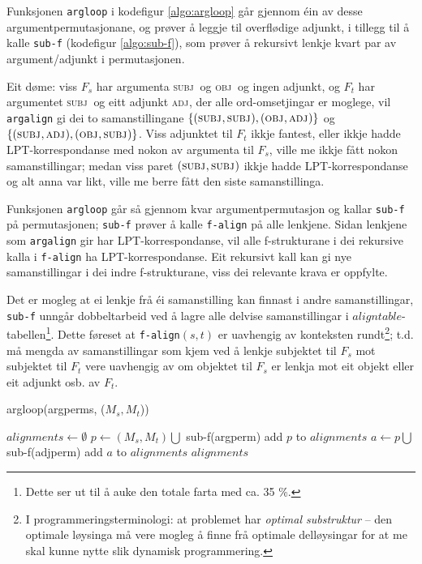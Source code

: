 \documentclass[12pt,a4paper,oneside,draft]{report}
\newcommand{\F}[2]{\textsc{#1}\ensuremath{_{#2}}}
\newcommand{\OBJ}{\F{obj}{}}
\newcommand{\OBJs}{\F{obj~}{}}
\newcommand{\ADJ}{\F{adj}{}}
\newcommand{\SUBJ}{\F{subj}{}}
\newcommand{\SUBJs}{\F{subj~}{}}
\begin{document}
 Funksjonen \texttt{argloop} i kodefigur \ref{algo:argloop} går gjennom éin
 av desse argumentpermutasjonane, og prøver å leggje til overflødige
 adjunkt, i tillegg til å kalle \texttt{sub-f} (kodefigur \ref{algo:sub-f}),
 som prøver å rekursivt lenkje kvart par av argument/adjunkt i
 permutasjonen.

 Eit døme: viss $F_s$ har argumenta \SUBJs og \OBJs og ingen adjunkt,
 og $F_t$ har argumentet \SUBJs og eitt adjunkt \ADJ, der alle
 ord-omsetjingar er moglege, vil \texttt{argalign} gi dei to samanstillingane
 $\{(\SUBJ,\SUBJ), (\OBJ,\ADJ)\}$ og $\{(\SUBJ,\ADJ),
 (\OBJ,\SUBJ)\}$. Viss adjunktet til $F_t$ ikkje fantest, eller ikkje
 hadde LPT\hyp{}korrespondanse med nokon av argumenta til $F_s$, ville me
 ikkje fått nokon samanstillingar; medan viss paret $(\SUBJ,\SUBJ)$
 ikkje hadde LPT\hyp{}korrespondanse og alt anna var likt, ville me berre
 fått den siste samanstillinga.

 Funksjonen \texttt{argloop} går så gjennom kvar argumentpermutasjon og
 kallar \texttt{sub-f} på permutasjonen; \texttt{sub-f} prøver å kalle \texttt{f-align} på
 alle lenkjene. Sidan lenkjene som \texttt{argalign} gir har
 LPT\hyp{}korrespondanse, vil alle f\hyp{}strukturane i dei rekursive kalla i
 \texttt{f-align} ha LPT\hyp{}korrespondanse. Eit rekursivt kall kan gi nye
 samanstillingar i dei indre f\hyp{}strukturane, viss dei relevante krava
 er oppfylte.

 Det er mogleg at ei lenkje frå éi samanstilling kan finnast i andre
 samanstillingar, \texttt{sub-f} unngår dobbeltarbeid ved å lagre alle
 delvise samanstillingar i $aligntable$-tabellen\footnote{Dette ser ut til å auke den totale farta med ca. 35 \%. }. Dette føreset
 at \texttt{f-align}$(s,t)$ er uavhengig av konteksten rundt\footnote{I programmeringsterminologi: at problemet har \emph{optimal         substruktur} -- den optimale løysinga må vere mogleg å finne
        frå optimale delløysingar for at me skal kunne nytte slik
        dynamisk programmering. };
 t.d. må mengda av samanstillingar som kjem ved å lenkje subjektet til
 $F_s$ mot subjektet til $F_t$ vere uavhengig av om objektet til $F_s$
 er lenkja mot eit objekt eller eit adjunkt osb. av $F_t$.

  \begin{algorithm}[htbp]
    \caption{argloop(argperms, ($M_s,M_t$))}
    \label{algo:argloop}

    $alignments \gets \emptyset$  \;
     {
       {
        $p \gets (M_s,M_t) \bigcup$ sub-f(argperm)
        add $p$ to $alignments$ \;
         {
          $a \gets p \bigcup$ sub-f(adjperm)  
          add $a$ to $alignments$\;
        } %
      } %
    }
    \Return $alignments$
  \end{algorithm}    
  
\end{document}

